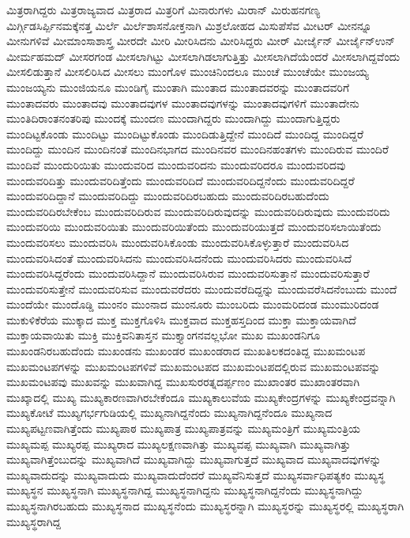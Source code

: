 {ಮಿತ್ರರಾಗಿದ್ದರು
ಮಿತ್ರರಾಜ್ಯವಾದ
ಮಿತ್ರರಾದ
ಮಿತ್ರರಿಗೆ
ಮಿನಾರುಗಳು
ಮಿರಾನ್
ಮಿರುಹನಗಣ್ಯ
ಮಿರ್ಗ್ಗಿಡಸಿರ್ಪ್ಪಿನಮಕ್ಕೆನತ್ತ
ಮಿರ್ಲೆ
ಮಿರ್ಲೆಶಾಸನೋಕ್ತನಾಗಿ
ಮಿಶ್ರಲೋಹದ
ಮಿಸುಪೆಸೆವ
ಮೀಟರ್
ಮೀನನ್ನೂ
ಮೀನುಗಳಿವೆ
ಮೀಮಾಂಸಾಶಾಸ್ತ್ರ
ಮೀರದೇ
ಮೀರಿ
ಮೀರಿಸಿದನು
ಮೀರಿಸಿದ್ದರು
ಮೀರ್
ಮೀರ್ಜೈನ್
ಮೀರ್ಜೈನ್ಉನ್
ಮೀರ್ಮಹಮದ್
ಮೀಸರಗಂಡ
ಮೀಸಲಾಗಿಟ್ಟು
ಮೀಸಲಾಗಿಡಲಾಗುತ್ತಿತ್ತು
ಮೀಸಲಾಗಿದೆಯೆಂದರೆ
ಮೀಸಲಾಗಿದ್ದವೆಂದು
ಮೀಸಲಿಡುತ್ತಾನೆ
ಮೀಸಲಿರಿಸಿದ
ಮೀಸಲು
ಮುಂಗೊಳ
ಮುಂಚಿನಿಂದಲೂ
ಮುಂಚೆ
ಮುಂಚೆಯೇ
ಮುಂಜಯ್ಯ
ಮುಂಜಯ್ಯನು
ಮುಂಜಿಯನೂ
ಮುಂಡಿಗೈ
ಮುಂತಾಗಿ
ಮುಂತಾದ
ಮುಂತಾದವರನ್ನು
ಮುಂತಾದವರಿಗೆ
ಮುಂತಾದವರು
ಮುಂತಾದವು
ಮುಂತಾದವುಗಳ
ಮುಂತಾದವುಗಳನ್ನು
ಮುಂತಾದವುಗಳಿಗೆ
ಮುಂತಾದೇನು
ಮುಂತಿದಿರಾಂತನಂತರಿಪು
ಮುಂದಕ್ಕೆ
ಮುಂದಣ
ಮುಂದಾಗಿದ್ದರು
ಮುಂದಾಗಿದ್ದು
ಮುಂದಾಗುತ್ತಿದ್ದರು
ಮುಂದಿಟ್ಟಕೊಂಡು
ಮುಂದಿಟ್ಟು
ಮುಂದಿಟ್ಟುಕೊಂಡು
ಮುಂದಿಡುತ್ತಿದ್ದೇನೆ
ಮುಂದಿದೆ
ಮುಂದಿದ್ದ
ಮುಂದಿದ್ದರೆ
ಮುಂದಿದ್ದು
ಮುಂದಿನ
ಮುಂದಿನಂತೆ
ಮುಂದಿನಭಾಗದ
ಮುಂದಿನವರ
ಮುಂದಿನಹಂತಗಳು
ಮುಂದಿರುವ
ಮುಂದಿರೆ
ಮುಂದಿವೆ
ಮುಂದುರಿಯಿತು
ಮುಂದುವರಿದ
ಮುಂದುವರಿದನು
ಮುಂದುವರಿದರೂ
ಮುಂದುವರಿದವು
ಮುಂದುವರಿದಿತ್ತು
ಮುಂದುವರಿದಿತ್ತೆಂದು
ಮುಂದುವರಿದಿದೆ
ಮುಂದುವರಿದಿದ್ದನೆಂದು
ಮುಂದುವರಿದಿದ್ದರೆ
ಮುಂದುವರಿದಿದ್ದಾನೆ
ಮುಂದುವರಿದಿದ್ದು
ಮುಂದುವರಿದಿರಬಹುದು
ಮುಂದುವರಿದಿರಬಹುದೆಂದು
ಮುಂದುವರಿದಿರಬೇಕೆಂಬ
ಮುಂದುವರಿದಿರುವ
ಮುಂದುವರಿದಿರುವುದನ್ನು
ಮುಂದುವರಿದಿರುವುದು
ಮುಂದುವರಿದು
ಮುಂದುವರಿಯಿ
ಮುಂದುವರಿಯಿತು
ಮುಂದುವರಿಯಿತೆಂದು
ಮುಂದುವರಿಯುತ್ತದೆ
ಮುಂದುವರಿಸಲಾಯಿತೆಂದು
ಮುಂದುವರಿಸಲು
ಮುಂದುವರಿಸಿ
ಮುಂದುವರಿಸಿಕೊಂಡು
ಮುಂದುವರಿಸಿಕೊಳ್ಳುತ್ತಾರೆ
ಮುಂದುವರಿಸಿದ
ಮುಂದುವರಿಸಿದಂತೆ
ಮುಂದುವರಿಸಿದನು
ಮುಂದುವರಿಸಿದನೆಂದು
ಮುಂದುವರಿಸಿದರು
ಮುಂದುವರಿಸಿದೆ
ಮುಂದುವರಿಸಿದ್ದರೆಂದು
ಮುಂದುವರಿಸಿದ್ದಾನೆ
ಮುಂದುವರಿಸಿರುವ
ಮುಂದುವರಿಸುತ್ತಾನೆ
ಮುಂದುವರಿಸುತ್ತಾರೆ
ಮುಂದುವರಿಸುತ್ತೇನೆ
ಮುಂದುವರಿಸುವ
ಮುಂದುವರೆದರು
ಮುಂದುವರೆದಿದ್ದನ್ನು
ಮುಂದುವರೆಸಿದನೆಂಬುದು
ಮುಂದೆ
ಮುಂದೆಯೇ
ಮುಂದೊಡ್ಡಿ
ಮುಂನಂ
ಮುಂನಾದ
ಮುಂನೂರು
ಮುಂಬರಿದು
ಮುಂಮರಿದಂಡ
ಮುಂಮುರಿದಂಡ
ಮುಕುಳಿಕೆರೆಯ
ಮುಕ್ಕಾದ
ಮುಕ್ತ
ಮುಕ್ತಗೊಳಿಸಿ
ಮುಕ್ತವಾದ
ಮುಕ್ತಹಸ್ತದಿಂದ
ಮುಕ್ತಾ
ಮುಕ್ತಾಯವಾಗಿದೆ
ಮುಕ್ತಾಯವಾಯಿತು
ಮುಕ್ತಿ
ಮುಕ್ತಿವನಿತಾಸ್ತನ
ಮುಕ್ತ್ಯಾಂಗನವಲ್ಲಭೋ
ಮುಖ
ಮುಖಂಡನಿಗೂ
ಮುಖಂಡನಿರಬಹುದೆಂದು
ಮುಖಂಡನು
ಮುಖಂಡರ
ಮುಖಂಡರಾದ
ಮುಖತಿಲಕದಂತಿದ್ದ
ಮುಖಮಂಟಪ
ಮುಖಮಂಟಪಗಳನ್ನು
ಮುಖಮಂಟಪಗಳಿವೆ
ಮುಖಮಂಟಪದ
ಮುಖಮಂಟಪದಲ್ಲಿರುವ
ಮುಖಮಂಟಪವನ್ನು
ಮುಖಮಂಟಪವು
ಮುಖವನ್ನು
ಮುಖವಾಗಿದ್ದ
ಮುಖಸುರರತ್ನದರ್ಪ್ಪಣಂ
ಮುಖಾಂತರ
ಮುಖಾಂತರವಾಗಿ
ಮುಖ್ಕಾದಲ್ಲಿ
ಮುಖ್ಯ
ಮುಖ್ಯಕಾರಣವಾಗಿರಬೇಕೆಂದೂ
ಮುಖ್ಯಕಾಲುವೆಯ
ಮುಖ್ಯಕೇಂದ್ರಗಳನ್ನು
ಮುಖ್ಯಕೇಂದ್ರವನ್ನಾಗಿ
ಮುಖ್ಯಕೋಟೆ
ಮುಖ್ಯಗರ್ಭಗುಡಿಯಲ್ಲಿ
ಮುಖ್ಯನಾಗಿದ್ದನೆಂದು
ಮುಖ್ಯನಾಗಿದ್ದನೆಂದೂ
ಮುಖ್ಯನಾದ
ಮುಖ್ಯಪಟ್ಟಣವಾಗಿತ್ತೆಂದು
ಮುಖ್ಯಪಾಠ
ಮುಖ್ಯಪಾತ್ರ
ಮುಖ್ಯಪಾತ್ರವನ್ನು
ಮುಖ್ಯಮಂತ್ರಿಗೆ
ಮುಖ್ಯಮಂತ್ರಿಯ
ಮುಖ್ಯಮಪ್ಪ
ಮುಖ್ಯರಪ್ಪ
ಮುಖ್ಯರಾದ
ಮುಖ್ಯಲಕ್ಷಣವಾಗಿತ್ತು
ಮುಖ್ಯವಪ್ಪ
ಮುಖ್ಯವಾಗಿ
ಮುಖ್ಯವಾಗಿತ್ತು
ಮುಖ್ಯವಾಗಿತ್ತೆಂಬುದನ್ನು
ಮುಖ್ಯವಾಗಿದೆ
ಮುಖ್ಯವಾಗಿದ್ದು
ಮುಖ್ಯವಾಗುತ್ತದೆ
ಮುಖ್ಯವಾದ
ಮುಖ್ಯವಾದವುಗಳನ್ನು
ಮುಖ್ಯವಾದುದನ್ನು
ಮುಖ್ಯವಾದುದು
ಮುಖ್ಯವಾದುದೆಂದರೆ
ಮುಖ್ಯವೆನಿಸುತ್ತದೆ
ಮುಖ್ಯಸರ್ವಾಧಿಪತ್ಯಕಂ
ಮುಖ್ಯಸ್ಥ
ಮುಖ್ಯಸ್ಥನ
ಮುಖ್ಯಸ್ಥನಾಗಿ
ಮುಖ್ಯಸ್ಥನಾಗಿದ್ದ
ಮುಖ್ಯಸ್ಥನಾಗಿದ್ದನು
ಮುಖ್ಯಸ್ಥನಾಗಿದ್ದನೆಂದು
ಮುಖ್ಯಸ್ಥನಾಗಿದ್ದು
ಮುಖ್ಯಸ್ಥನಾಗಿರಬಹುದು
ಮುಖ್ಯಸ್ಥನಾದ
ಮುಖ್ಯಸ್ಥನೆಂದು
ಮುಖ್ಯಸ್ಥರನ್ನಾಗಿ
ಮುಖ್ಯಸ್ಥರನ್ನು
ಮುಖ್ಯಸ್ಥರಲ್ಲಿ
ಮುಖ್ಯಸ್ಥರಾಗಿ
ಮುಖ್ಯಸ್ಥರಾಗಿದ್ದ
}
